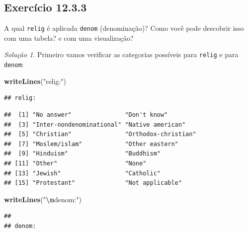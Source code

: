\documentclass[
]{latex/krantz}
\newenvironment{Shaded}{\begin{snugshade}}{\end{snugshade}}
\newcommand{\FunctionTok}[1]{\textcolor[rgb]{0.13,0.29,0.53}{\textbf{#1}}}
\newcommand{\NormalTok}[1]{#1}
\newcommand{\SpecialCharTok}[1]{\textcolor[rgb]{0.81,0.36,0.00}{\textbf{#1}}}
\newcommand{\StringTok}[1]{\textcolor[rgb]{0.31,0.60,0.02}{#1}}
\theoremstyle{definition}
\theoremstyle{definition}
\theoremstyle{definition}
\theoremstyle{definition}
\theoremstyle{remark}
\newtheorem*{solution}{Solução}
\begin{document}
\hypertarget{exr12-3-3}{%
\subsection*{Exercício 12.3.3}\label{exr12-3-3}}

A qual \texttt{relig} é aplicada \texttt{denom} (denominação)? Como você pode descobrir isso com uma tabela? e com uma visualização?

\begin{solution}
Primeiro vamos verificar as categorias possíveis para \texttt{relig} e para \texttt{denom}:

\begin{Shaded}
\begin{Highlighting}[]
\FunctionTok{writeLines}\NormalTok{(}\StringTok{"relig:"}\NormalTok{)}
\end{Highlighting}
\end{Shaded}

\begin{verbatim}
## relig:
\end{verbatim}

\begin{Shaded}
\end{Shaded}

\begin{verbatim}
##  [1] "No answer"               "Don't know"             
##  [3] "Inter-nondenominational" "Native american"        
##  [5] "Christian"               "Orthodox-christian"     
##  [7] "Moslem/islam"            "Other eastern"          
##  [9] "Hinduism"                "Buddhism"               
## [11] "Other"                   "None"                   
## [13] "Jewish"                  "Catholic"               
## [15] "Protestant"              "Not applicable"
\end{verbatim}

\begin{Shaded}
\begin{Highlighting}[]
\FunctionTok{writeLines}\NormalTok{(}\StringTok{"}\SpecialCharTok{\textbackslash{}n}\StringTok{denom:"}\NormalTok{)}
\end{Highlighting}
\end{Shaded}

\begin{verbatim}
## 
## denom:
\end{verbatim}


\end{solution}
\end{document}

